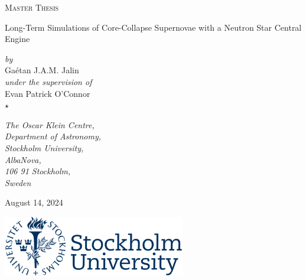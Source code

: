 \begin{titlepage}
    \selectfont
    \begin{center}
        \vspace*{0.3cm}
        {\large \textsc{Master Thesis}}\\
        \vspace{0.5\baselineskip}
        \begin{spacing}{1.9}
            {\huge Long-Term Simulations
            \break %
            of Core-Collapse Supernovae with a
            \break %
            Neutron Star Central Engine}
        \end{spacing}

        \vspace*{0.8cm}

        {\textit{by}}\\
        \vspace*{0.6cm}
        {\Large Gaétan J.A.M. Jalin}\\
        \vspace*{0.8cm}
        {\textit{under the supervision of}}\\
        \vspace*{0.6cm}
        {\large Evan Patrick O'Connor}\\

        \vfill
        \(\star\)
        \vfill
        
        \textit{
        The Oscar Klein Centre,\\
        Department of Astronomy,\\
        Stockholm University,\\
        AlbaNova,\\
        106 91 Stockholm,\\
        Sweden
        }

        \vspace*{0.7cm}

        {August 14, 2024}

        \vspace*{1.1cm}
        \includegraphics[width=0.6\textwidth]{SU_large.png}

        \vspace*{0.5cm}
    \end{center}
\end{titlepage}